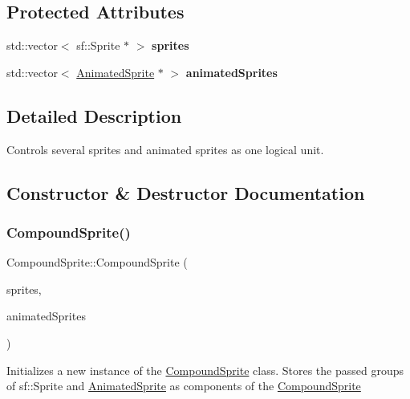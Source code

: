 \subsection*{Protected Attributes}
\begin{DoxyCompactItemize}
\item 
\mbox{\label{class_compound_sprite_a9f374a78c285f1e5c2508c650d014c44}} 
std\+::vector$<$ sf\+::\+Sprite $\ast$ $>$ {\bfseries sprites}
\item 
\mbox{\label{class_compound_sprite_afd9c27afcb2f7852931359be94aae42a}} 
std\+::vector$<$ \hyperlink{class_animated_sprite}{Animated\+Sprite} $\ast$ $>$ {\bfseries animated\+Sprites}
\end{DoxyCompactItemize}


\subsection{Detailed Description}
Controls several sprites and animated sprites as one logical unit. 



\subsection{Constructor \& Destructor Documentation}
\mbox{\label{class_compound_sprite_ae9cc3d47da7d32e94b4c96c1ca55322c}} 
\subsubsection{\texorpdfstring{Compound\+Sprite()}{CompoundSprite()}}
{\footnotesize\ttfamily Compound\+Sprite\+::\+Compound\+Sprite (\begin{DoxyParamCaption}\item[{const std\+::vector$<$ sf\+::\+Sprite $\ast$$>$ \&}]{sprites,  }\item[{const std\+::vector$<$ \hyperlink{class_animated_sprite}{Animated\+Sprite} $\ast$$>$ \&}]{animated\+Sprites }\end{DoxyParamCaption})}



Initializes a new instance of the \hyperlink{class_compound_sprite}{Compound\+Sprite} class. Stores the passed groups of sf\+::\+Sprite and \hyperlink{class_animated_sprite}{Animated\+Sprite} as components of the \hyperlink{class_compound_sprite}{Compound\+Sprite} 


